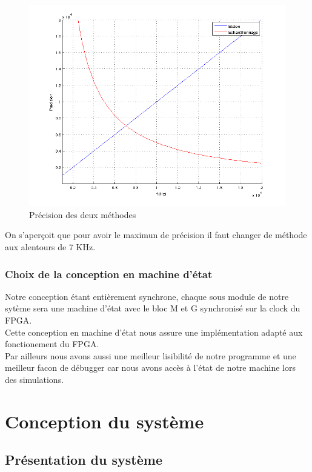 \documentclass[a4paper,11pt]{article}
\begin{document}
\begin{figure}[H]
\begin{center}
	\includegraphics[scale=.5]{graphMethode.png}
	\caption{Précision des deux méthodes}
\end{center}
\end{figure}
On s'aperçoit que pour avoir le maximun de précision il faut changer de méthode aux alentours de 7 KHz. 

\subsubsection{Choix de la conception en machine d'état}
Notre conception étant entièrement synchrone, chaque sous module de notre sytème sera une machine d'état avec le bloc M et G synchronisé sur
la clock du FPGA.\\
Cette conception en machine d'état nous assure une implémentation adapté aux fonctionement du FPGA.\\ 
Par ailleurs nous avons aussi une meilleur lisibilité de notre programme et une meilleur facon de débugger car nous avons accès à l'état de notre machine lors des simulations.\\
\newpage
\section{Conception du système}

\subsection{Présentation du système}
\end{document}
